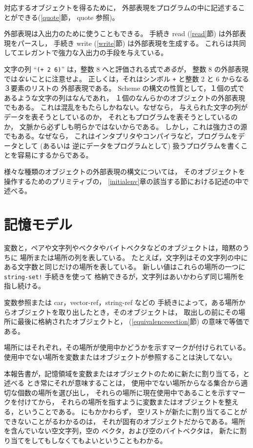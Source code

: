 対応するオブジェクトを得るために，
外部表現をプログラムの中に記述することができる(\ref{quote}節， {\cf quote} 参照)。

外部表現は入出力のために使うこともできる。
手続き {\cf read} (\ref{read}節) は外部表現をパースし，
手続き {\cf write} (\ref{write}節) は外部表現を生成する。
これらは共同してエレガントで強力な入出力の手段を与えている。

文字の列 ``{\tt(+ 2 6)}'' は，整数 8 へと評価される式で{\em ある}が，
整数 8 の外部表現では{\em ない}ことに注意せよ。
正しくは，それはシンボル {\tt +} と整数 2 と 6 からなる３要素のリストの
外部表現である。
Scheme の構文の性質として，１個の式であるような文字の列はなんであれ，
１個のなんらかのオブジェクトの外部表現でもある。
これは混乱をもたらしかねない。なぜなら，
与えられた文字の列がデータを表そうとしているのか，
それともプログラムを表そうとしているのか，
文脈から必ずしも明らかではないからである。
しかし，これは強力さの源でもある。なぜなら，
これはインタプリタやコンパイラなど，プログラムをデータとして (あるいは
逆にデータをプログラムとして) 扱うプログラムを書くことを容易にするからである。

様々な種類のオブジェクトの外部表現の構文については，
そのオブジェクトを操作するためのプリミティブの，
\ref{initialenv}章の該当する節における記述の中で述べる。

\section{記憶モデル}
\label{storagemodel}

変数と，ペアや文字列やベクタやバイトベクタなどのオブジェクトは，暗黙のうちに
場所または場所の列を表している。
たとえば，文字列はその文字列の中にある文字数と同じだけの場所を表している。
新しい値はこれらの場所の一つに {\tt string-set!} 手続きを使って
格納できるが，文字列はあいかわらず同じ場所を指し続ける。

変数参照または {\cf car}，{\cf vector-ref}，{\cf string-ref} などの
手続きによって，ある場所からオブジェクトを取り出したとき，そのオブジェクトは，
取出しの前にその場所に最後に格納されたオブジェクトと，
(\ref{equivalencesection}節) の意味で等価である。

場所にはそれぞれ，その場所が使用中かどうかを示すマークが付けられている。
使用中でない場所を変数またはオブジェクトが参照することは決してない。

本報告書が，記憶領域を変数またはオブジェクトのために新たに割り当てる，と述べる
とき常にそれが意味することは，
使用中でない場所からなる集合から適切な個数の場所を選び出し，
それらの場所に現在使用中であることを示すマークを付けてから，
それらの場所を指すように変数またはオブジェクトを整える，ということである。
にもかかわらず，
空リストが新たに割り当てることができないことがるわかるのは，
それが固有のオブジェクトだからである。場所を含んでいない空文字列，空の
ベクタ，および空のバイトベクタは，
新たに割り当てをしてもしなくてもよいということもわかる。

